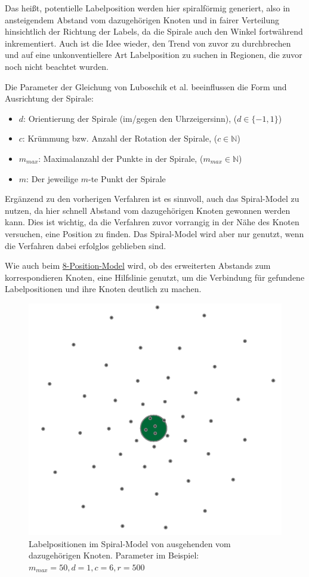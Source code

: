 Das heißt, potentielle Labelposition werden hier spiralförmig generiert, also in ansteigendem Abstand vom dazugehörigen Knoten und in fairer Verteilung hinsichtlich der Richtung der Labels, da die Spirale auch den Winkel fortwährend inkrementiert.
Auch ist die Idee wieder, den Trend von zuvor zu durchbrechen und auf eine unkonventiellere Art Labelposition zu suchen in Regionen, die zuvor noch nicht beachtet wurden.

Die Parameter der Gleichung von Luboschik et al.\cite{main} beeinflussen die Form und Ausrichtung der Spirale:
\begin{itemize}
    \item $d$: Orientierung der Spirale (im/gegen den Uhrzeigersinn), ($d \in \{-1, 1 \}$)
    \item $c$: Krümmung bzw. Anzahl der Rotation der Spirale, ($c \in \mathbb{N}$)
    \item $m_{max}$: Maximalanzahl der Punkte in der Spirale, ($m_{max} \in \mathbb{N}$)
    \item $m$: Der jeweilige $m$-te Punkt der Spirale
\end{itemize}

Ergänzend zu den vorherigen Verfahren ist es sinnvoll, auch das Spiral-Model zu nutzen, da hier schnell Abstand vom dazugehörigen Knoten gewonnen werden kann.
Dies ist wichtig, da die Verfahren zuvor vorrangig in der Nähe des Knoten versuchen, eine Position zu finden. Das Spiral-Model wird aber nur genutzt,
wenn die Verfahren dabei erfolglos geblieben sind.

Wie auch beim \hyperref[subsubsec:8pos]{8-Position-Model} wird, ob des erweiterten Abstands zum korrespondieren Knoten, eine Hilfslinie genutzt,
um die Verbindung für gefundene Labelpositionen und ihre Knoten deutlich zu machen.

\begin{figure}[H]
    \centering
    \includegraphics[scale=0.55]{../img/sample}
    \caption{Labelpositionen im Spiral-Model von ausgehenden vom dazugehörigen Knoten.
    Parameter im Beispiel: $m_{max}=50,d=1,c=6,r=500$}
    \label{fig:spiral}
\end{figure}